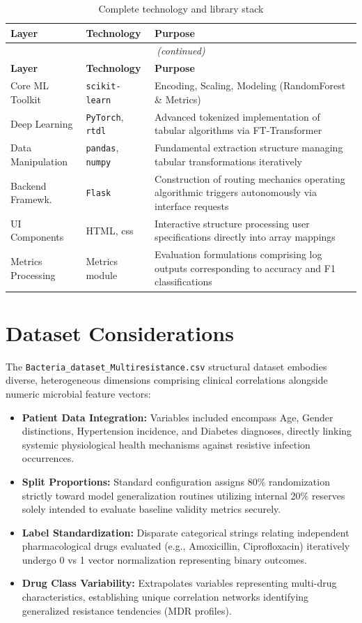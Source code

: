 \documentclass[12pt,a4paper]{report}
\begin{document}
\begin{longtable}{@{}p{3.0cm}p{3.0cm}p{7.3cm}@{}}
\toprule
\textbf{Layer} & \textbf{Technology} & \textbf{Purpose} \\
\midrule
\endfirsthead
\multicolumn{3}{c}{\small\textit{(continued)}}\\
\toprule
\textbf{Layer} & \textbf{Technology} & \textbf{Purpose}\\
\midrule
\endhead
\bottomrule
\caption{Complete technology and library stack}
\label{tab:stack}
\endlastfoot
\bottomrule
\endfoot
Core ML Toolkit & \texttt{scikit-learn} & Encoding, Scaling, Modeling (RandomForest \& Metrics) \\
Deep Learning & \texttt{PyTorch}, \texttt{rtdl} & Advanced tokenized implementation of tabular algorithms via FT-Transformer \\
Data Manipulation & \texttt{pandas}, \texttt{numpy} & Fundamental extraction structure managing tabular transformations iteratively \\
Backend Framewk. & \texttt{Flask} & Construction of routing mechanics operating algorithmic triggers autonomously via interface requests \\
UI Components & HTML, css & Interactive structure processing user specifications directly into array mappings \\
Metrics Processing& Metrics module & Evaluation formulations comprising log outputs corresponding to accuracy and F1 classifications \\
\end{longtable}

\section{Dataset Considerations}

The \texttt{Bacteria\_dataset\_Multiresistance.csv} structural dataset embodies diverse, heterogeneous dimensions comprising clinical correlations alongside numeric microbial feature vectors:

\begin{itemize}[noitemsep, leftmargin=*]
  \item \textbf{Patient Data Integration:} Variables included encompass Age, Gender distinctions, Hypertension incidence, and Diabetes diagnoses, directly linking systemic physiological health mechanisms against resistive infection occurrences.
  \item \textbf{Split Proportions:} Standard configuration assigns 80\% randomization strictly toward model generalization routines utilizing internal 20\% reserves solely intended to evaluate baseline validity metrics securely.
  \item \textbf{Label Standardization:} Disparate categorical strings relating independent pharmacological drugs evaluated (e.g., Amoxicillin, Ciprofloxacin) iteratively undergo 0 vs 1 vector normalization representing binary outcomes.
  \item \textbf{Drug Class Variability:} Extrapolates variables representing multi-drug characteristics, establishing unique correlation networks identifying generalized resistance tendencies (MDR profiles).
\end{itemize}
\end{document}
